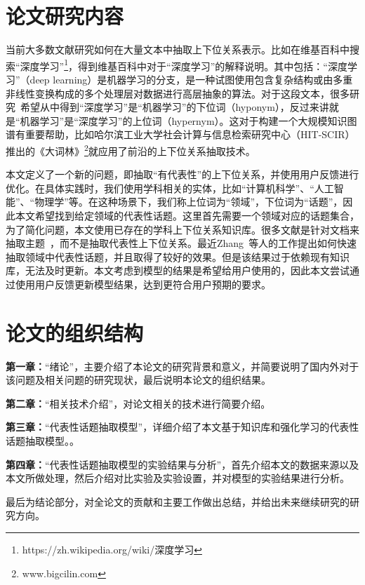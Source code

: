 \section{论文研究内容}
当前大多数文献研究如何在大量文本中抽取上下位关系表示。比如在维基百科中搜索“深度学习”\footnote{https://zh.wikipedia.org/wiki/深度学习}，得到维基百科中对于“深度学习”的解释说明。其中包括：“深度学习”（deep learning）是机器学习的分支，是一种试图使用包含复杂结构或由多重非线性变换构成的多个处理层对数据进行高层抽象的算法。对于这段文本，很多研究~\cite{wang2018predicting,liang2017transitivity}希望从中得到“深度学习”是“机器学习”的下位词（hyponym），反过来讲就是“机器学习”是“深度学习”的上位词（hypernym）。这对于构建一个大规模知识图谱有重要帮助，比如哈尔滨工业大学社会计算与信息检索研究中心（HIT-SCIR）推出的《大词林》\footnote{www.bigcilin.com}就应用了前沿的上下位关系抽取技术。

本文定义了一个新的问题，即抽取“有代表性”的上下位关系，并使用用户反馈进行优化。在具体实践时，我们使用学科相关的实体，比如“计算机科学”、“人工智能”、“物理学”等。在这种场景下，我们称上位词为“领域”，下位词为“话题”，因此本文希望找到给定领域的代表性话题。这里首先需要一个领域对应的话题集合，为了简化问题，本文使用已存在的学科上下位关系知识库。很多文献是针对文档来抽取主题~，而不是抽取代表性上下位关系。最近Zhang~\cite{zhang2018fast}等人的工作提出如何快速抽取领域中代表性话题，并且取得了较好的效果。但是该结果过于依赖现有知识库，无法及时更新。本文考虑到模型的结果是希望给用户使用的，因此本文尝试通过使用用户反馈更新模型结果，达到更符合用户预期的要求。
\section{论文的组织结构}
\textbf{第一章：}“绪论”，主要介绍了本论文的研究背景和意义，并简要说明了国内外对于该问题及相关问题的研究现状，最后说明本论文的组织结果。

\textbf{第二章：}“相关技术介绍”，对论文相关的技术进行简要介绍。

\textbf{第三章：}“代表性话题抽取模型”，详细介绍了本文基于知识库和强化学习的代表性话题抽取模型。。

\textbf{第四章：}“代表性话题抽取模型的实验结果与分析”，首先介绍本文的数据来源以及本文所做处理，然后介绍对比实验及实验设置，并对模型的实验结果进行分析。


最后为结论部分，对全论文的贡献和主要工作做出总结，并给出未来继续研究的研究方向。



